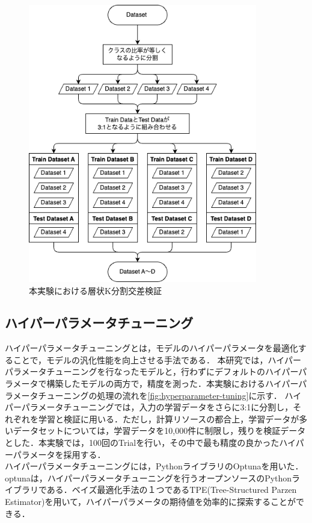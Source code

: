 \begin{figure}[htbp]
    \centering
    \includegraphics[width=10cm]{figures/stratified-k-fold.png}
    \caption{本実験における層状K分割交差検証}
    \label{fig:k-fold}
\end{figure}

\subsection{ハイパーパラメータチューニング}\label{sec:optuna}
ハイパーパラメータチューニングとは，モデルのハイパーパラメータを最適化することで，モデルの汎化性能を向上させる手法である．
本研究では，ハイパーパラメータチューニングを行なったモデルと，行わずにデフォルトのハイパーパラメータで構築したモデルの両方で，精度を測った．本実験におけるハイパーパラメータチューニングの処理の流れを\ref{fig:hyperparameter-tuning}に示す．
ハイパーパラメータチューニングでは，入力の学習データをさらに3:1に分割し，それぞれを学習と検証に用いる．ただし，計算リソースの都合上，学習データが多いデータセットについては，学習データを10,000件に制限し，残りを検証データとした．本実験では，100回のTrialを行い，その中で最も精度の良かったハイパーパラメータを採用する．\\
ハイパーパラメータチューニングには，PythonライブラリのOptunaを用いた．
optuna\cite{optuna}は，ハイパーパラメータチューニングを行うオープンソースのPythonライブラリである．ベイズ最適化手法の１つであるTPE(Tree-Structured Parzen Estimator)を用いて，ハイパーパラメータの期待値を効率的に探索することができる．


